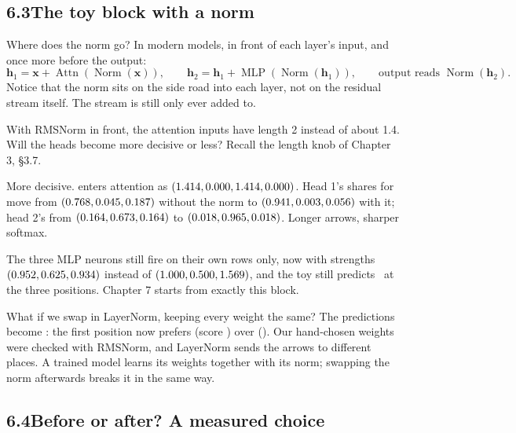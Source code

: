 
\subsection*{6.3\quad The toy block with a norm}

Where does the norm go? In modern models, in front of each layer's input, and once more before the output:
\[
\bm{h}_1 = \bm{x} + \operatorname{Attn}(\operatorname{Norm}(\bm{x})), \qquad
\bm{h}_2 = \bm{h}_1 + \operatorname{MLP}(\operatorname{Norm}(\bm{h}_1)), \qquad
\text{output reads } \operatorname{Norm}(\bm{h}_2).
\]
Notice that the norm sits on the side road into each layer, not on the residual stream itself. The stream is
still only ever added to.

\Predict With RMSNorm in front, the attention inputs have length 2 instead of about 1.4. Will the heads become
more decisive or less? Recall the length knob of Chapter 3, \S3.7.

\Sanity More decisive.  enters attention as $(1.414, 0.000, 1.414, 0.000)$. Head 1's shares for  move
from $(0.768, 0.045, 0.187)$ without the norm to $(0.941, 0.003, 0.056)$ with it; head 2's from $(0.164, 0.673, 0.164)$ to
$(0.018, 0.965, 0.018)$. Longer arrows, sharper softmax.

The three MLP neurons still fire on their own rows only, now with strengths $(0.952, 0.625, 0.934)$ instead of
$(1.000, 0.500, 1.569)$, and the toy still predicts \nSixPredRms\ at the three positions. Chapter 7 starts from exactly
this block.

What if we swap in LayerNorm, keeping every weight the same? The predictions become \nSixPredLayer: the first
position now prefers \tok{\nSixLnTopWaste} (score \nSixLnTopWasteLogit) over  (\nSixLnOfLogit). Our
hand-chosen weights were checked with RMSNorm, and LayerNorm sends the arrows to different places. A trained
model learns its weights together with its norm; swapping the norm afterwards breaks it in the same way.


\subsection*{6.4\quad Before or after? A measured choice}

